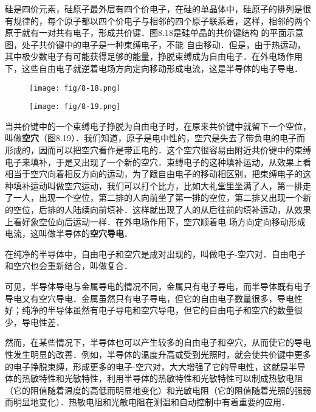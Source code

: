 硅是四价元素，硅原子最外层有四个价电子，在硅的单晶体中，硅原子的排列是很有规律的，每个原子都以四个价电子与相邻的四个原子联系着，这样，相邻的两个原于就有一对共有电子，形成共价键．图8.18是硅单晶的共价键结构
的平面示意图，处子共价键中的电子是一种束缚电子，不能
自由移动．但是，由于热运动，其中极少数电子有可能获得足够的能量，挣脱束缚成为自由电子．在外电场作用下，这些自由电子就逆着电场方向定向移动形成电流，这是半导体的电子导电．
\begin{figure}[htp]
    \centering
    \begin{minipage}[t]{0.48\textwidth}
    \centering
    \texttt{[image: fig/8-18.png]}
    \caption{}
    \end{minipage}
    \begin{minipage}[t]{0.48\textwidth}
    \centering
    \texttt{[image: fig/8-19.png]}
    \caption{}
    \end{minipage}
    \end{figure}

当共价键中的一个束缚电子挣脱为自由电子时，在原来共价键中就留下一个空位，叫做\textbf{空穴}（图8.19）．我们知道，原子是电中性的，空穴是失去了带负电的电子而形成的，因而可以把空穴看作是带正电的．这个空穴很容易由附近共价键中的束缚电子来填补，于是又出现了一个新的空穴．束缚电子的这种填补运动，从效果上看相当于空穴向着相反方向的运动，为了跟自由电子的移动相区别，把束缚电子的这种填补运动叫做空穴运动，我们可以打个比方，比如大礼堂里坐满了人，第一排走了一人，出现一个空位，第二排的人向前坐了第一排的空位，第二排又出现一个新的空位，后排的人陆续向前填补．这样就出现了人的从后往前的填补运动，从效果上看好象空位向后运动一样．在外电场作用下，空穴顺着电
场方向定向移动形成电流，这叫做半导体的\textbf{空穴导电}．

在纯净的半导体中，自由电子和空穴是成对出现的，叫做电子-空穴对．自由电子和空穴也会重新结合，叫做复合．

可见，半导体导电与金属导电的情况不同，金属只有电子导电，而半导体既有电子导电又有空穴导电．金属虽然只有电子导电，但它的自由电子数量很多，导电性好；纯净的半导体虽然有电子导电和空穴导电，但它的自由电子和空穴的数量很少，导电性差．

然而，在某些情况下，半导体也可以产生较多的自由电子和空穴，从而使它的导电性发生明显的改善．例如，半导体的温度升高或受到光照时，就会使共价键中更多的电子挣脱束缚，形成更多的电子-空穴对，大大增强了它的导电性，这就是半导体的热敏特性和光敏特性，利用半导体的热敏特性和光敏特性可以制成热敏电阻（它的阻值随着温度的高低而明显地变化）和光敏电阻（它的阻值随着光照的强弱而明显地变化）．热敏电阻和光敏电阻在测温和自动控制中有着重要的应用．

